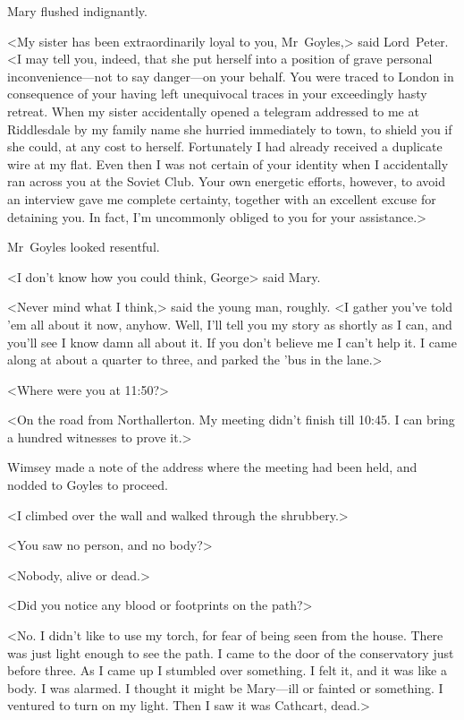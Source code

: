 Mary flushed indignantly.

<My sister has been extraordinarily loyal to you, Mr~Goyles,> said Lord~Peter. <I may tell you, indeed, that she put herself into a position of grave personal inconvenience—not to say danger—on your behalf. You were traced to London in consequence of your having left unequivocal traces in your exceedingly hasty retreat. When my sister accidentally opened a telegram addressed to me at Riddlesdale by my family name she hurried immediately to town, to shield you if she could, at any cost to herself. Fortunately I had already received a duplicate wire at my flat. Even then I was not certain of your identity when I accidentally ran across you at the Soviet Club. Your own energetic efforts, however, to avoid an interview gave me complete certainty, together with an excellent excuse for detaining you. In fact, I'm uncommonly obliged to you for your assistance.>

Mr~Goyles looked resentful.

<I don't know how you could think, George\longdash> said Mary.

<Never mind what I think,> said the young man, roughly. <I gather you've told 'em all about it now, anyhow. Well, I'll tell you my story as shortly as I can, and you'll see I know damn all about it. If you don't believe me I can't help it. I came along at about a quarter to three, and parked the 'bus in the lane.>

<Where were you at 11:50?>

<On the road from Northallerton. My meeting didn't finish till 10:45. I can bring a hundred witnesses to prove it.>

Wimsey made a note of the address where the meeting had been held, and nodded to Goyles to proceed.

<I climbed over the wall and walked through the shrubbery.>

<You saw no person, and no body?>

<Nobody, alive or dead.>

<Did you notice any blood or footprints on the path?>

<No. I didn't like to use my torch, for fear of being seen from the house. There was just light enough to see the path. I came to the door of the conservatory just before three. As I came up I stumbled over something. I felt it, and it was like a body. I was alarmed. I thought it might be Mary—ill or fainted or something. I ventured to turn on my light. Then I saw it was Cathcart, dead.>

